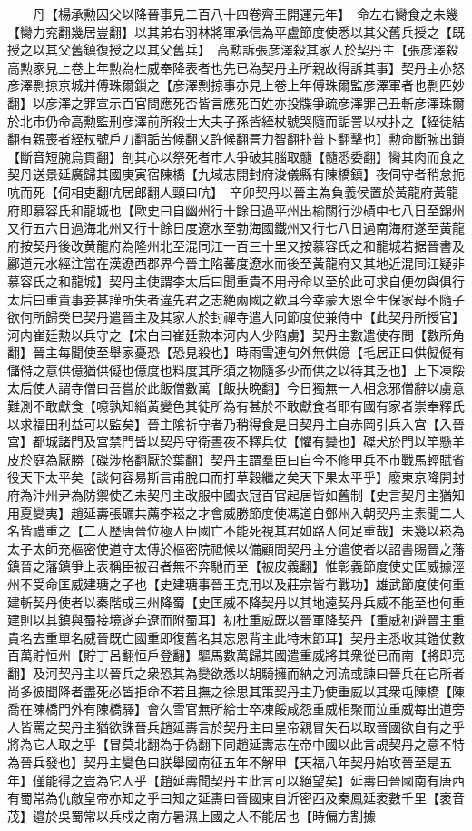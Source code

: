 　　丹【楊承勲囚父以降晉事見二百八十四卷齊王開運元年】　命左右臠食之未幾【臠力兖翻幾居豈翻】以其弟右羽林將軍承信為平盧節度使悉以其父舊兵授之【既授之以其父舊鎮復授之以其父舊兵】　高勲訴張彦澤殺其家人於契丹主【張彦澤殺高勲家見上卷上年勲為杜威奉降表者也先已為契丹主所親故得訴其事】契丹主亦怒彦澤剽掠京城并傅珠爾鎻之【彦澤剽掠事亦見上卷上年傅珠爾監彦澤軍者也剽匹妙翻】以彦澤之罪宣示百官問應死否皆言應死百姓亦投牒爭疏彦澤罪己丑斬彦澤珠爾於北市仍命高勲監刑彦澤前所殺士大夫子孫皆絰杖號哭隨而詬詈以杖扑之【絰徒結翻有親喪者絰杖號戶刀翻詬苦候翻又許候翻詈力智翻扑普卜翻擊也】勲命斷腕出鎖【斷音短腕烏貫翻】剖其心以祭死者市人爭破其腦取髓【髓悉委翻】臠其肉而食之　契丹送景延廣歸其國庚寅宿陳橋【九域志開封府浚儀縣有陳橋鎮】夜伺守者稍怠扼吭而死【伺相吏翻吭居郎翻人頸曰吭】　辛卯契丹以晉主為負義侯置於黃龍府黃龍府即慕容氏和龍城也【歐史曰自幽州行十餘日過平州出榆關行沙磧中七八日至錦州又行五六日過海北州又行十餘日度遼水至勃海國鐵州又行七八日過南海府遂至黃龍府按契丹後改黄龍府為隆州北至混同江一百三十里又按慕容氏之和龍城若据晉書及酈道元水經注當在漢遼西郡界今晉主陷蕃度遼水而後至黃龍府又其地近混同江疑非慕容氏之和龍城】契丹主使謂李太后曰聞重貴不用母命以至於此可求自便勿與俱行太后曰重貴事妾甚謹所失者違先君之志絶兩國之歡耳今幸蒙大恩全生保家母不隨子欲何所歸癸巳契丹遣晉主及其家人於封禪寺遣大同節度使兼侍中【此契丹所授官】河内崔廷勲以兵守之【宋白曰崔廷勲本河内人少陷虜】契丹主數遣使存問【數所角翻】晉主每聞使至舉家憂恐【恐見殺也】時雨雪連旬外無供億【毛居正曰供儗儗有儲偫之意供億猶供儗也億度也料度其所須之物隨多少而供之以待其乏也】上下凍餒太后使人謂寺僧曰吾嘗於此飯僧數萬【飯扶晩翻】今日獨無一人相念邪僧辭以虜意難測不敢獻食【噫孰知緇黃變色其徒所為有甚於不敢獻食者耶有國有家者崇奉釋氏以求福田利益可以監矣】晉主隂祈守者乃稍得食是日契丹主自赤岡引兵入宫【入晉宫】都城諸門及宫禁門皆以契丹守衛晝夜不釋兵仗【懼有變也】磔犬於門以竿懸羊皮於庭為厭勝【磔涉格翻厭於葉翻】契丹主謂羣臣曰自今不修甲兵不市戰馬輕賦省役天下太平矣【談何容易斯言甫脫口而打草穀繼之矣天下果太平乎】廢東京降開封府為汴州尹為防禦使乙未契丹主改服中國衣冠百官起居皆如舊制【史言契丹主猶知用夏變夷】趙延夀張礪共薦李崧之才會威勝節度使馮道自鄧州入朝契丹主素聞二人名皆禮重之【二人歷唐晉位極人臣國亡不能死視其君如路人何足重哉】未幾以崧為太子太師充樞密使道守太傅於樞密院祗候以備顧問契丹主分遣使者以詔書賜晉之藩鎮晉之藩鎮爭上表稱臣被召者無不奔馳而至【被皮義翻】惟彰義節度使史匡威據涇州不受命匡威建瑭之子也【史建瑭事晉王克用以及莊宗皆冇戰功】雄武節度使何重建斬契丹使者以秦階成三州降蜀【史匡威不降契丹以其地遠契丹兵威不能至也何重建則以其鎮與蜀接境遂弃遼而附蜀耳】初杜重威既以晉軍降契丹【重威初避晉主重貴名去重單名威晉既亡國重即復舊名其忘恩背主此特末節耳】契丹主悉收其鎧仗數百萬貯恒州【貯丁呂翻恒戶登翻】驅馬數萬歸其國遣重威將其衆從已而南【將即亮翻】及河契丹主以晉兵之衆恐其為變欲悉以胡騎擁而納之河流或諫曰晉兵在它所者尚多彼聞降者盡死必皆拒命不若且撫之徐思其策契丹主乃使重威以其衆屯陳橋【陳喬在陳橋門外有陳橋驛】會久雪官無所給士卒凍餒咸怨重威相聚而泣重威每出道旁人皆罵之契丹主猶欲誅晉兵趙延夀言於契丹主曰皇帝親冒矢石以取晉國欲自有之乎將為它人取之乎【冒莫北翻為于偽翻下同趙延夀志在帝中國以此言覘契丹之意不特為晉兵發也】契丹主變色曰朕舉國南征五年不解甲【天福八年契丹始攻晉至是五年】僅能得之豈為它人乎【趙延夀聞契丹主此言可以絕望矣】延夀曰晉國南有唐西有蜀常為仇敵皇帝亦知之乎曰知之延夀曰晉國東自沂密西及秦鳳延袤數千里【袤音茂】邉於吳蜀常以兵戍之南方暑濕上國之人不能居也【時偏方割據